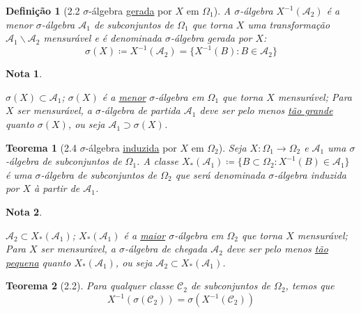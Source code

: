 \documentclass[12pt,a4paper,answers]{article}
\numberwithin{equation}{section} %
\newcommand{\inv}[1]{#1^{-1}}      %
\newcommand{\Acal}{\mathcal{A}}
\newcommand{\Ccal}{\mathcal{C}}
\newcommand{\sig}{$\sigma$}
\theoremstyle{thm_estilo}
\newtheorem{theorem}{Teorema}[section]
\newtheorem{definition}{Definição}[section]
\theoremstyle{thm_note_est}
\newtheorem*{note}{Nota}
\begin{document}
\begin{definition}[2.2 \sig-álgebra \underline{gerada} por $X$ em $\Omega_1$]
	A \sig-álgebra $\inv{X}(\Acal_2)$ é a menor \sig-álgebra $\Acal_1$ de subconjuntos de $\Omega_1$ que torna $X$ uma transformação $\Acal_1\backslash\Acal_2$ mensurável e é denominada \textit{\sig-álgebra gerada} por $X$:
	\begin{equation}
		\sigma(X) \coloneq \inv{X}(\Acal_2) = \{\inv{X}(B): B \in \Acal_2\}
	\end{equation}
\end{definition}

\begin{note}
	\leavevmode
	\begin{outline}[enumerate]
		\1 $\sigma(X) \subset \Acal_1$;
		\1 $\sigma(X)$ é a \underline{menor} \sig-álgebra em $\Omega_1$ que torna $X$ mensurável;
		\1 Para $X$ ser mensurável, a \sig-álgebra de partida $\Acal_1$ deve ser pelo menos \underline{tão grande} quanto $\sigma(X)$, ou seja $\Acal_1 \supset \sigma(X)$.
	\end{outline}
\end{note}

\begin{theorem}[2.4 \sig-álgebra \underline{induzida} por $X$ em $\Omega_2$]
	Seja $X\colon\Omega_1\to\Omega_2$ e $\Acal_1$ uma \sig-álgebra de subconjuntos de $\Omega_1$. A classe $X_*(\Acal_1) \coloneq \{ B \subset \Omega_2: \inv{X}(B) \in \Acal_1 \}$ é uma \sig-álgebra de subconjuntos de $\Omega_2$ que será denominada \textit{\sig-álgebra induzida} por $X$ à partir de $\Acal_1$.
\end{theorem}

\begin{note}
	\leavevmode
	\begin{outline}[enumerate]
		\1 $\Acal_2 \subset X_*(\Acal_1)$;
		\1 $X_*(\mathcal{A}_1)$ é a \underline{maior} \sig-álgebra em $\Omega_2$ que torna $X$ mensurável;
		\1 Para $X$ ser mensurável, a \sig-álgebra de chegada $\Acal_2$ deve ser pelo menos \underline{tão pequena} quanto $X_*(\Acal_1)$, ou seja $\Acal_2 \subset X_*(\Acal_1)$.
	\end{outline}
\end{note}

\begin{theorem}[2.2] 
	Para qualquer classe $\Ccal_2$ de subconjuntos de $\Omega_2$, temos que
	\begin{equation}
		\inv{X}(\sigma(\Ccal_2)) = \sigma(\inv{X}(\Ccal_2))
	\end{equation}
\end{theorem}
\end{document}
